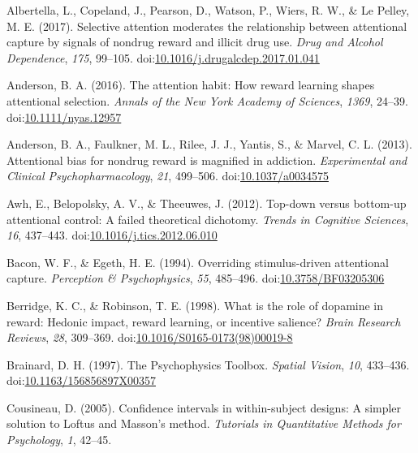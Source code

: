 \documentclass[jou, a4paper, noextraspace,floatsintext]{apa6}
\theoremstyle{definition}
\theoremstyle{definition}
\theoremstyle{definition}
\theoremstyle{remark}
\begin{document}
\hypertarget{refs}{}
\hypertarget{ref-Albertella2017a}{}
Albertella, L., Copeland, J., Pearson, D., Watson, P., Wiers, R. W., \&
Le Pelley, M. E. (2017). Selective attention moderates the relationship
between attentional capture by signals of nondrug reward and illicit
drug use. \emph{Drug and Alcohol Dependence}, \emph{175}, 99--105.
doi:\href{https://doi.org/10.1016/j.drugalcdep.2017.01.041}{10.1016/j.drugalcdep.2017.01.041}

\hypertarget{ref-Anderson2015a}{}
Anderson, B. A. (2016). The attention habit: How reward learning shapes
attentional selection. \emph{Annals of the New York Academy of
Sciences}, \emph{1369}, 24--39.
doi:\href{https://doi.org/10.1111/nyas.12957}{10.1111/nyas.12957}

\hypertarget{ref-Anderson2013}{}
Anderson, B. A., Faulkner, M. L., Rilee, J. J., Yantis, S., \& Marvel,
C. L. (2013). Attentional bias for nondrug reward is magnified in
addiction. \emph{Experimental and Clinical Psychopharmacology},
\emph{21}, 499--506.
doi:\href{https://doi.org/10.1037/a0034575}{10.1037/a0034575}

\hypertarget{ref-Awh2012}{}
Awh, E., Belopolsky, A. V., \& Theeuwes, J. (2012). Top-down versus
bottom-up attentional control: A failed theoretical dichotomy.
\emph{Trends in Cognitive Sciences}, \emph{16}, 437--443.
doi:\href{https://doi.org/10.1016/j.tics.2012.06.010}{10.1016/j.tics.2012.06.010}

\hypertarget{ref-Bacon1994}{}
Bacon, W. F., \& Egeth, H. E. (1994). Overriding stimulus-driven
attentional capture. \emph{Perception \& Psychophysics}, \emph{55},
485--496.
doi:\href{https://doi.org/10.3758/BF03205306}{10.3758/BF03205306}

\hypertarget{ref-Berridge1998}{}
Berridge, K. C., \& Robinson, T. E. (1998). What is the role of dopamine
in reward: Hedonic impact, reward learning, or incentive salience?
\emph{Brain Research Reviews}, \emph{28}, 309--369.
doi:\href{https://doi.org/10.1016/S0165-0173(98)00019-8}{10.1016/S0165-0173(98)00019-8}

\hypertarget{ref-Brainard1997}{}
Brainard, D. H. (1997). The Psychophysics Toolbox. \emph{Spatial
Vision}, \emph{10}, 433--436.
doi:\href{https://doi.org/10.1163/156856897X00357}{10.1163/156856897X00357}

\hypertarget{ref-Cousineau2005}{}
Cousineau, D. (2005). Confidence intervals in within-subject designs: A
simpler solution to Loftus and Masson's method. \emph{Tutorials in
Quantitative Methods for Psychology}, \emph{1}, 42--45.
\end{document}
